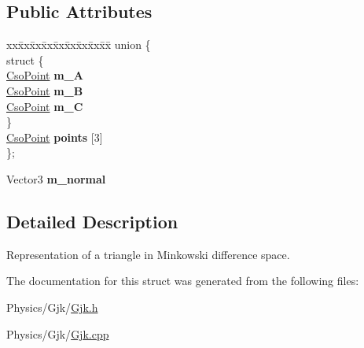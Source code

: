 \subsection*{Public Attributes}
\begin{DoxyCompactItemize}
\item 
\mbox{\label{structGjk_1_1CsoTriangle_afc388c5a11f4edf9d95dde1e2baa1453}} 
\begin{tabbing}
xx\=xx\=xx\=xx\=xx\=xx\=xx\=xx\=xx\=\kill
union \{\\
\mbox{\label{unionGjk_1_1CsoTriangle_1_1_0D14_ab7b8f7296e9f94e1b6ed18b552cae39e}} 
\>struct \{\\
\>\>\hyperlink{structGjk_1_1CsoPoint}{CsoPoint} {\bfseries m\_A}\\
\>\>\hyperlink{structGjk_1_1CsoPoint}{CsoPoint} {\bfseries m\_B}\\
\>\>\hyperlink{structGjk_1_1CsoPoint}{CsoPoint} {\bfseries m\_C}\\
\>\} \\
\>\hyperlink{structGjk_1_1CsoPoint}{CsoPoint} {\bfseries points} \mbox{[}3\mbox{]}\\
\}; \\

\end{tabbing}\item 
\mbox{\label{structGjk_1_1CsoTriangle_a328ee0494e17af474a8c9f524a15d8da}} 
Vector3 {\bfseries m\+\_\+normal}
\end{DoxyCompactItemize}


\subsection{Detailed Description}
Representation of a triangle in Minkowski difference space. 

The documentation for this struct was generated from the following files\+:\begin{DoxyCompactItemize}
\item 
Physics/\+Gjk/\hyperlink{Gjk_8h}{Gjk.\+h}\item 
Physics/\+Gjk/\hyperlink{Gjk_8cpp}{Gjk.\+cpp}\end{DoxyCompactItemize}
